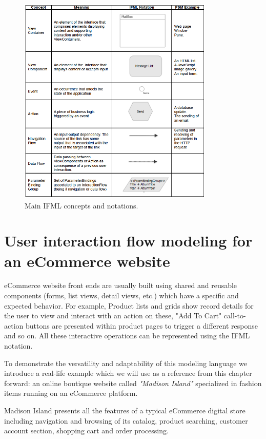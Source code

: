 \vspace{0.5cm}
\begin{figure}[htbp]
  \centering
    \includegraphics[height=10cm]{images/ifml.jpg}
  \caption{Main IFML concepts and notations.}
  \label{fig:ifml}
\end{figure}
\vspace{0.5cm}

\section{User interaction flow modeling for an eCommerce website}

eCommerce website front ends are usually built using shared and reusable components (forms, list views, detail views, etc.) which have a specific and expected behavior.
For example, Product lists and grids show record details for the user to view and interact with an action on these, "Add To Cart" call-to-action buttons are presented within product pages to trigger a different response and so on.
All these interactive operations can be represented using the IFML notation.

To demonstrate the versatility and adaptability of this modeling language we introduce a real-life example which we will use as a reference from this chapter forward: an online boutique website called \textit{"Madison Island"} specialized in fashion items running on an eCommerce platform.

Madison Island presents all the features of a typical eCommerce digital store including navigation and browsing of its catalog, product searching, customer account section, shopping cart and order processing. 



